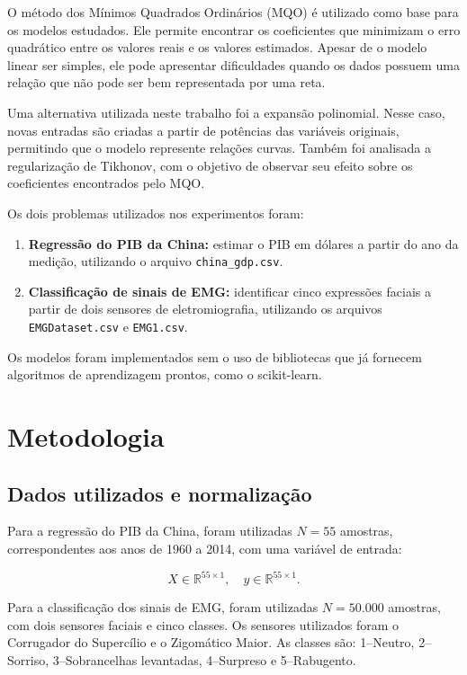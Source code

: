 \documentclass[conference]{IEEEtran}
\begin{document}
O método dos Mínimos Quadrados Ordinários (MQO) é utilizado como base para os modelos estudados. Ele permite encontrar os coeficientes que minimizam o erro quadrático entre os valores reais e os valores estimados. Apesar de o modelo linear ser simples, ele pode apresentar dificuldades quando os dados possuem uma relação que não pode ser bem representada por uma reta.

Uma alternativa utilizada neste trabalho foi a expansão polinomial. Nesse caso, novas entradas são criadas a partir de potências das variáveis originais, permitindo que o modelo represente relações curvas. Também foi analisada a regularização de Tikhonov, com o objetivo de observar seu efeito sobre os coeficientes encontrados pelo MQO.

Os dois problemas utilizados nos experimentos foram:

\begin{enumerate}
    \item \textbf{Regressão do PIB da China:} estimar o PIB em dólares a partir do ano da medição, utilizando o arquivo \texttt{china\_gdp.csv}.
    \item \textbf{Classificação de sinais de EMG:} identificar cinco expressões faciais a partir de dois sensores de eletromiografia, utilizando os arquivos \texttt{EMGDataset.csv} e \texttt{EMG1.csv}.
\end{enumerate}

Os modelos foram implementados sem o uso de bibliotecas que já fornecem algoritmos de aprendizagem prontos, como o scikit-learn.

\section{Metodologia}

\subsection{Dados utilizados e normalização}

Para a regressão do PIB da China, foram utilizadas $N=55$ amostras, correspondentes aos anos de 1960 a 2014, com uma variável de entrada:

\begin{equation}
X \in \mathbb{R}^{55 \times 1}, \quad
y \in \mathbb{R}^{55 \times 1}.
\end{equation}

Para a classificação dos sinais de EMG, foram utilizadas $N=50.000$ amostras, com dois sensores faciais e cinco classes. Os sensores utilizados foram o Corrugador do Supercílio e o Zigomático Maior. As classes são: 1--Neutro, 2--Sorriso, 3--Sobrancelhas levantadas, 4--Surpreso e 5--Rabugento.
\end{document}

